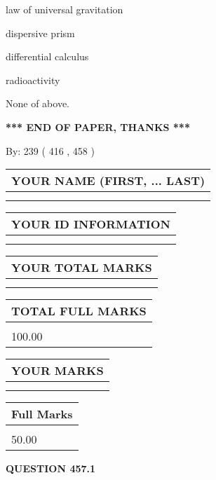\documentclass[12pt]{article}
\begin{document}
 
law of universal gravitation
 
 
dispersive prism
 
 
differential calculus
 
 
radioactivity
 
 
 None of above.
 
 
   
   
\vspace{1.0in} 
{\textbf{\large{ *** END OF PAPER, THANKS *** }}} 
   
   
\hspace{1.0in} By: 
 239 ( 416 ,  458 )
   
   
   
   
\newpage 
\setcounter{page}{ 
   457001 } 
   
   
   
   
\noindent\begin{tabular}{|l|}
\hline
YOUR NAME (FIRST, ... LAST)  \\
\hline
 \\ 
 \\ 
\hline
\end{tabular}
\hspace{0.05in} \begin{tabular}{|l|}
\hline
 YOUR   ID   INFORMATION  \\
\hline
 \\ 
 \\ 
\hline
\end{tabular}
   
   
\vspace{0.2in}\noindent\begin{tabular}{|l|}
\hline
YOUR TOTAL MARKS  \\
\hline
 \\ 
 \\ 
\hline
\end{tabular}
\hspace{0.05in} \begin{tabular}{|l|}
\hline
TOTAL FULL MARKS  \\
\hline
 \\ 
100.00 \\
\hline
\end{tabular}
  
\vspace{0.2in}
  
\noindent\begin{tabular}{|l|}
\hline
 YOUR MARKS  \\
\hline
 \\ 
 \\ 
\hline
\end{tabular}
\hspace{0.05in} \begin{tabular}{|l|}
\hline
 Full Marks  \\
\hline
 \\ 
50.00 \\
\hline
\end{tabular}
{\textbf{\Large{QUESTION
457.1 
}}}
  
\end{document}
